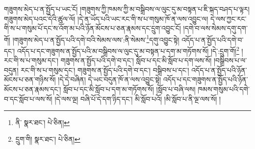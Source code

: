 གཟུགས་མེད་པ་ན་སྤྱོད་པ་ཡང་ངོ། །གཟུགས་ཀྱི་ཁམས་ཀྱི་མ་བསྒྲིབས་ལ་ལུང་དུ་མ་བསྟན་པ་ཇི་སྐད་བཤད་པ་ལྟར། གཟུགས་མེད་པའང་དེའི་ཚུལ་ལོ། །དེ་ན་ཡོད་པའི་ཡང་རང་གི་ས་པ་གསུམ་ཁོ་ན་ལས་འབྱུང་ལ། དེ་ལས་ཀྱང་རང་གི་ས་པ་གསུམ་པོ་དང་ས་འོག་མ་པའི་ཉོན་མོངས་པ་ཅན་རྣམས་དང་དྲུག་འབྱུང་ངོ། །དགེ་བ་ལས་སེམས་དགུ་དག་གོ། །གཟུགས་མེད་པ་ན་སྤྱོད་པའི་དགེ་བའི་སེམས་ལས་:ནི་སེམས་\footnote{ནི་  སྣར་ཐང་།  པེ་ཅིན། }དགུ་འབྱུང་སྟེ། འདོད་པ་ན་སྤྱོད་པའི་དགེ་བ་དང་། འདོད་པ་དང་གཟུགས་ན་སྤྱོད་པའི་མ་བསྒྲིབས་ལ་ལུང་དུ་མ་བསྟན་པ་དག་མ་གཏོགས་སོ། །དེ་:དྲུག་གོ།\footnote{དྲུག་གི།  སྣར་ཐང་།  པེ་ཅིན། } །རང་གི་ས་པ་གསུམ་དང་། གཟུགས་ན་སྤྱོད་པའི་དགེ་བ་དང་། སློབ་པ་དང་མི་སློབ་པ་དག་ལས་སོ། །བསྒྲིབས་པ་ལ་བདུན། རང་གི་ས་པ་གསུམ་དང་། གཟུགས་ན་སྤྱོད་པའི་དགེ་བ་དང་། བསྒྲིབས་པ་དང་། འདོད་པ་ན་སྤྱོད་པའི་ཉོན་མོངས་པ་ཅན་གཉིས་སོ། །དེ་དེ་བཞིན། དེ་ཡང་བདུན་ཁོ་ན་ལས་འབྱུང་སྟེ། འདོད་པ་དང་གཟུགས་ན་སྤྱོད་པའི་ཉོན་མོངས་པ་ཅན་རྣམས་དང་། སློབ་པ་དང་མི་སློབ་པ་དག་མ་གཏོགས་སོ། །སློབ་པ་བཞི་ལས། ཁམས་གསུམ་པའི་དགེ་བ་དང་སློབ་པ་ལས་སོ། །དེ་ལས་ལྔ། བཞི་པོ་དེ་དག་ཉིད་དང་། མི་སློབ་པའོ། །མི་སློབ་པ་ནི་ལྔ་ལས་སོ། །
